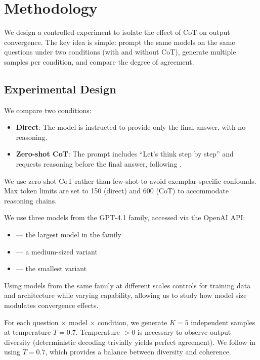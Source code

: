 \section{Methodology}
\label{sec:method}

We design a controlled experiment to isolate the effect of CoT on output convergence. The key idea is simple: prompt the same models on the same questions under two conditions (with and without CoT), generate multiple samples per condition, and compare the degree of agreement.

\subsection{Experimental Design}

 We compare two conditions:
\begin{itemize}[leftmargin=*,itemsep=0pt,topsep=0pt]
    \item \textbf{Direct}: The model is instructed to provide only the final answer, with no reasoning.
    \item \textbf{Zero-shot CoT}: The prompt includes ``Let's think step by step'' and requests reasoning before the final answer, following \citet{kojima2022large}.
\end{itemize}
We use zero-shot CoT rather than few-shot to avoid exemplar-specific confounds. Max token limits are set to 150 (direct) and 600 (CoT) to accommodate reasoning chains.

 We use three models from the GPT-4.1 family, accessed via the OpenAI API:
\begin{itemize}[leftmargin=*,itemsep=0pt,topsep=0pt]
    \item \gptlarge --- the largest model in the family
    \item \gptmini --- a medium-sized variant
    \item \gptnano --- the smallest variant
\end{itemize}
Using models from the same family at different scales controls for training data and architecture while varying capability, allowing us to study how model size modulates convergence effects.

 For each question $\times$ model $\times$ condition, we generate $K = 5$ independent samples at temperature $T = 0.7$. Temperature $> 0$ is necessary to observe output diversity (deterministic decoding trivially yields perfect agreement). We follow \citet{wang2022self} in using $T = 0.7$, which provides a balance between diversity and coherence.

